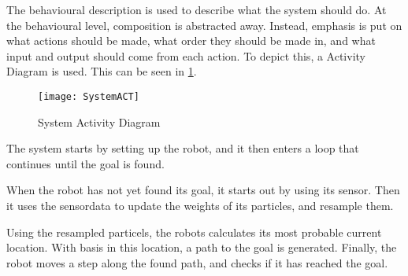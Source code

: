 \documentclass[Main]{subfiles}
\begin{document}
		The behavioural description is used to describe what the system should do.
		At the behavioural level, composition is abstracted away. 
		Instead, emphasis is put on what actions should be made, what order they should be made in, and what input and output should come from each action.
		To depict this, a Activity Diagram is used. This can be seen in \ref{fig:systemact}.
		
		\begin{figure}[H]
			\centering
			\texttt{[image: SystemACT]}
			\caption{System Activity Diagram}
			\label{fig:systemact}
		\end{figure}
		
		The system starts by setting up the robot, and it then enters a loop that continues until the goal is found.
		
		When the robot has not yet found its goal, it starts out by using its sensor.
		Then it uses the sensordata to update the weights of its particles, and resample them.
		
		Using the resampled particels, the robots calculates its most probable current location.
		With basis in this location, a path to the goal is generated.
		Finally, the robot moves a step along the found path, and checks if it has reached the goal.


\end{document}
